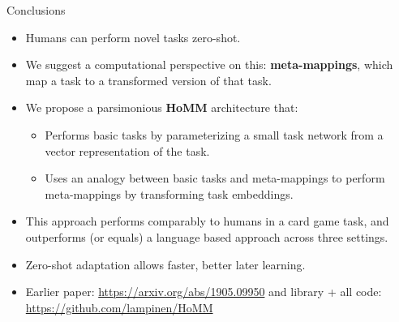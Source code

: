 \documentclass{beamer}
\begin{document}

\begin{frame}{Conclusions}

\begin{itemize}
\item Humans can perform novel tasks zero-shot. 
\item We suggest a computational perspective on this: \textbf{meta-mappings}, which map a task to a transformed version of that task. 
\item We propose a parsimonious \textbf{HoMM} architecture that: 
    \begin{itemize}
    \item Performs basic tasks by parameterizing a small task network from a vector representation of the task. 
    \item Uses an analogy between basic tasks and meta-mappings to perform meta-mappings by transforming task embeddings. 
    \end{itemize}
\item This approach performs comparably to humans in a card game task, and outperforms (or equals) a language based approach across three settings.
\item Zero-shot adaptation allows faster, better later learning. 
\item Earlier paper: \url{https://arxiv.org/abs/1905.09950} and library + all code: \url{https://github.com/lampinen/HoMM}
\end{itemize}
\end{frame}
\end{document}
